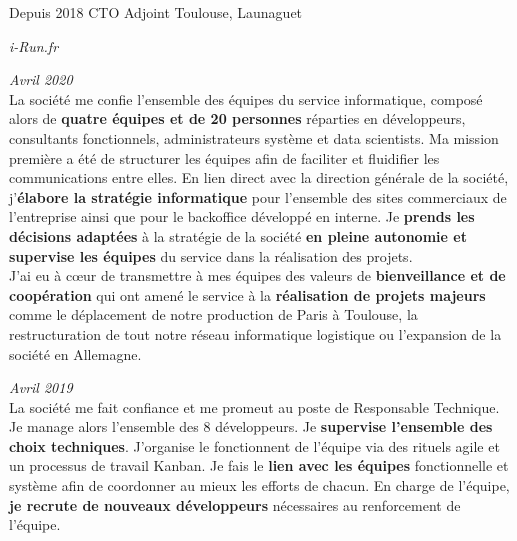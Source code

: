 \documentclass{friggeri-cv} 	%
\begin{document}
\begin{entrylist}
\entry
{Depuis 2018}
{CTO Adjoint}
{Toulouse, Launaguet}
{\vspace{-0.2cm}\emph{i-Run.fr} \\

\begin{description}[leftmargin=0cm]
    \item [\hspace*{-1cm}\bodyfont{|} \normalfont \textbf{\color{orange}CTO \color{headercolor}Adjoint}] \hfill \textit{Avril 2020}\\
    La société me confie l’ensemble des équipes du service informatique, composé alors de \textbf{quatre équipes et de 20 personnes} réparties en développeurs, consultants fonctionnels, administrateurs système et data scientists. Ma mission première a été de structurer les équipes afin de faciliter et fluidifier les communications entre elles. En lien direct avec la direction générale de la société, j’\textbf{élabore la stratégie informatique} pour l’ensemble des sites commerciaux de l’entreprise ainsi que pour le backoffice développé en interne. Je \textbf{prends les décisions adaptées} à la stratégie de la société \textbf{en pleine autonomie et supervise les équipes} du service dans la réalisation des projets.\\
    J’ai eu à c\oe{ur} de transmettre à mes équipes des valeurs de \textbf{bienveillance et de coopération} qui ont amené le service à la \textbf{réalisation de projets majeurs} comme le déplacement de notre production de Paris à Toulouse, la restructuration de tout notre réseau informatique logistique ou l’expansion de la société en Allemagne.
    \item [\hspace*{-1cm}\bodyfont{|} \normalfont \textbf{\color{orange}Responsable \color{headercolor}Technique}] \hfill \textit{Avril 2019}\\
    La société me fait confiance et me promeut au poste de Responsable Technique. Je manage alors l’ensemble des 8 développeurs. Je \textbf{supervise l’ensemble des choix techniques}. J’organise le fonctionnent de l’équipe via des rituels agile et un processus de travail Kanban. Je fais le \textbf{lien avec les équipes} fonctionnelle et système afin de coordonner au mieux les efforts de chacun. En charge de l’équipe, \textbf{je recrute de nouveaux développeurs} nécessaires au renforcement de l’équipe.

\end{description}}
\end{entrylist}
\end{document}
